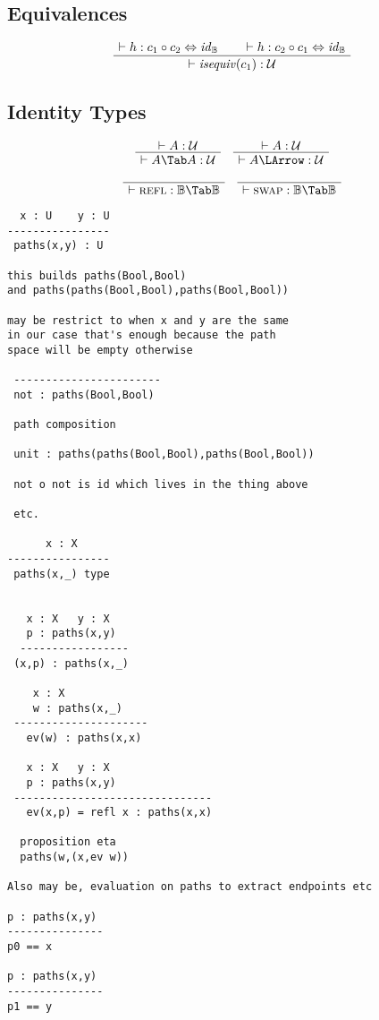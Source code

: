 \documentclass[format=acmlarge,review,natbib]{acmart}
\newcommand{\patht}[1]{#1 \Tab #1}
\newcommand{\fpatht}[1]{#1 \LArrow}
\newcommand{\compc}{\circ}
\newcommand{\reflp}{\textsc{refl}}
\newcommand{\swapp}{\textsc{swap}}
\newcommand{\isequiv}[1]{\mathit{isequiv}(#1)}
\newcommand{\idc}{\mathit{id}}
\newcommand{\isotwo}{\Leftrightarrow}
\newcommand{\boolt}{\mathbb{B}}
\newcommand{\univ}{\mathcal{U}}
\newcommand{\proves}{\vdash}
\newcommand{\jdg}[2]{\proves #1 : #2}
\begin{document}
\subsection{Equivalences}

\[\begin{array}{c}
  \AxiomC{$\jdg{h}{c_1\compc c_2 \isotwo \idc_{\boolt}}$}
  \AxiomC{$\jdg{h}{c_2\compc c_1 \isotwo \idc_{\boolt}}$}
  \BinaryInfC{$\jdg{\isequiv{c_1}}{\univ}$}
  \DisplayProof
\end{array}\]

\subsection{Identity Types}

\[\begin{array}{c}
  \AxiomC{$\jdg{A}{\univ}$}
  \UnaryInfC{$\jdg{\patht{A}}{\univ}$}
  \DisplayProof
\quad
  \AxiomC{$\jdg{A}{\univ}$}
  \UnaryInfC{$\jdg{\fpatht{A}}{\univ}$}
  \DisplayProof
\\
\\
  \AxiomC{}
  \UnaryInfC{$\jdg{\reflp}{\patht{\boolt}}$}
  \DisplayProof
\quad
  \AxiomC{}
  \UnaryInfC{$\jdg{\swapp}{\patht{\boolt}}$}
  \DisplayProof
\end{array}\]

\begin{verbatim}
  x : U    y : U
----------------
 paths(x,y) : U

this builds paths(Bool,Bool)
and paths(paths(Bool,Bool),paths(Bool,Bool))

may be restrict to when x and y are the same
in our case that's enough because the path
space will be empty otherwise

 -----------------------
 not : paths(Bool,Bool)

 path composition

 unit : paths(paths(Bool,Bool),paths(Bool,Bool))

 not o not is id which lives in the thing above

 etc.

      x : X
----------------
 paths(x,_) type


   x : X   y : X
   p : paths(x,y)
  -----------------
 (x,p) : paths(x,_)

    x : X
    w : paths(x,_)
 ---------------------
   ev(w) : paths(x,x)

   x : X   y : X
   p : paths(x,y)
 -------------------------------
   ev(x,p) = refl x : paths(x,x)

  proposition eta
  paths(w,(x,ev w))

Also may be, evaluation on paths to extract endpoints etc

p : paths(x,y)
---------------
p0 == x

p : paths(x,y)
---------------
p1 == y

\end{verbatim}
\end{document}

